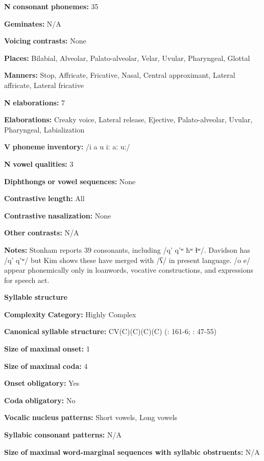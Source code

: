\textbf{N} \textbf{consonant} \textbf{phonemes:} 35

\textbf{Geminates:} N/A

\textbf{Voicing} \textbf{contrasts:} None

\textbf{Places:} Bilabial, Alveolar, Palato-alveolar, Velar, Uvular, Pharyngeal, Glottal

\textbf{Manners:} Stop, Affricate, Fricative, Nasal, Central approximant, Lateral affricate, Lateral fricative

\textbf{N} \textbf{elaborations:} 7

\textbf{Elaborations:} Creaky voice, Lateral release, Ejective, Palato-alveolar, Uvular, Pharyngeal, Labialization

\textbf{V} \textbf{phoneme} \textbf{inventory:} /i a u iː aː uː/

\textbf{N} \textbf{vowel} \textbf{qualities:} 3

\textbf{Diphthongs} \textbf{or} \textbf{vowel} \textbf{sequences:} None

\textbf{Contrastive} \textbf{length:} All

\textbf{Contrastive} \textbf{nasalization:} None

\textbf{Other} \textbf{contrasts:} N/A

\textbf{Notes:} Stonham reports 39 consonants, including /q’ q’ʷ ħʷ ɬʷ/. Davidson has /q’ q’ʷ/ but Kim shows these have merged with /ʕ/ in present language. /o e/ appear phonemically only in loanwords, vocative constructions, and expressions for speech act.

\textbf{Syllable} \textbf{structure}

\textbf{Complexity} \textbf{Category:} Highly Complex

\textbf{Canonical} \textbf{syllable} \textbf{structure:} CV(C)(C)(C)(C) (\citealt{Kim2003}: 161-6; \citealt{Stonham1999}: 47-55)

\textbf{Size} \textbf{of} \textbf{maximal} \textbf{onset:} 1

\textbf{Size} \textbf{of} \textbf{maximal} \textbf{coda:} 4

\textbf{Onset} \textbf{obligatory:} Yes

\textbf{Coda} \textbf{obligatory:} No

\textbf{Vocalic} \textbf{nucleus} \textbf{patterns:} Short vowels, Long vowels

\textbf{Syllabic} \textbf{consonant} \textbf{patterns:} N/A

\textbf{Size} \textbf{of} \textbf{maximal} \textbf{word{}-marginal sequences with syllabic obstruents:} N/A

